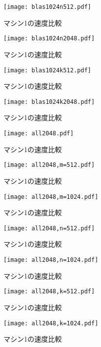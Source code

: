 \documentclass[11pt,a4paper]{jsreport}
\theoremstyle{definition}
\begin{document}
\begin{figure}[H]
\centering
\texttt{[image: blas1024n512.pdf]}
\caption{マシン1の速度比較}
\end{figure}

\begin{figure}[H]
\centering
\texttt{[image: blas1024n2048.pdf]}
\caption{マシン1の速度比較}
\end{figure}

\begin{figure}[H]
\centering
\texttt{[image: blas1024k512.pdf]}
\caption{マシン1の速度比較}
\end{figure}

\begin{figure}[H]
\centering
\texttt{[image: blas1024k2048.pdf]}
\caption{マシン1の速度比較}
\end{figure}

\begin{figure}[H]
\centering
\texttt{[image: all2048.pdf]}
\caption{マシン1の速度比較}
\end{figure}

\begin{figure}[H]
\centering
\texttt{[image: all2048,m=512.pdf]}
\caption{マシン1の速度比較}
\end{figure}

\begin{figure}[H]
\centering
\texttt{[image: all2048,m=1024.pdf]}
\caption{マシン1の速度比較}
\end{figure}

\begin{figure}[H]
\centering
\texttt{[image: all2048,n=512.pdf]}
\caption{マシン1の速度比較}
\end{figure}

\begin{figure}[H]
\centering
\texttt{[image: all2048,n=1024.pdf]}
\caption{マシン1の速度比較}
\end{figure}

\begin{figure}[H]
\centering
\texttt{[image: all2048,k=512.pdf]}
\caption{マシン1の速度比較}
\end{figure}

\begin{figure}[H]
\centering
\texttt{[image: all2048,k=1024.pdf]}
\caption{マシン1の速度比較}
\end{figure}
\end{document}

